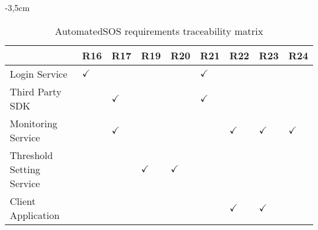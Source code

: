 \begin{table}
\begin{adjustwidth}{-3,5cm}{}
\captionsetup{justification=centering}
\caption{AutomatedSOS requirements traceability matrix}
  \label{tab:table2}
\begin{tabular}{|l||l|l|l|l|l|l|l|l|}
\hline
\cellcolor[HTML]{EFEFEF}                      & \cellcolor[HTML]{EFEFEF}R16 & \cellcolor[HTML]{EFEFEF}R17 & \cellcolor[HTML]{EFEFEF}R19 & \cellcolor[HTML]{EFEFEF}R20 & \cellcolor[HTML]{EFEFEF}R21 & \cellcolor[HTML]{EFEFEF}R22 & \cellcolor[HTML]{EFEFEF}R23 & \cellcolor[HTML]{EFEFEF}R24 \\ \hline \hline
\cellcolor[HTML]{EFEFEF}Login Service     &  $\checkmark$  &       &   &    & $\checkmark$   &    &    &    \\ \hline
\cellcolor[HTML]{EFEFEF}Third Party SDK         &    & $\checkmark$     &    &   &  $\checkmark$  &    &    &   \\ \hline
\cellcolor[HTML]{EFEFEF}Monitoring Service    &    &   $\checkmark$ &      &    &    &  $\checkmark$  & $\checkmark$  &  $\checkmark$  \\ \hline
\cellcolor[HTML]{EFEFEF}Threshold Setting Service  &    &       &  $\checkmark$  &  $\checkmark$  &    &    &    &    \\ \hline
\cellcolor[HTML]{EFEFEF}Client Application  &    &    &       &    &    &  $\checkmark$  &  $\checkmark$  &     \\ \hline
\end{tabular}
\end{adjustwidth}
\end{table}

